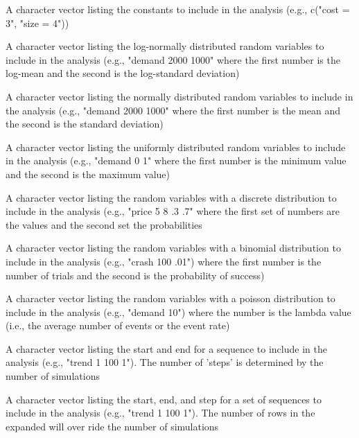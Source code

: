 \documentclass[a4paper]{book}
\begin{document}
\begin{Arguments}
\begin{ldescription}
\item[\code{const}] A character vector listing the constants to include in the analysis (e.g., c("cost = 3", "size = 4"))

\item[\code{lnorm}] A character vector listing the log-normally distributed random variables to include in the analysis (e.g., "demand 2000 1000" where the first number is the log-mean and the second is the log-standard deviation)

\item[\code{norm}] A character vector listing the normally distributed random variables to include in the analysis (e.g., "demand 2000 1000" where the first number is the mean and the second is the standard deviation)

\item[\code{unif}] A character vector listing the uniformly distributed random variables to include in the analysis (e.g., "demand 0 1" where the first number is the minimum value and the second is the maximum value)

\item[\code{discrete}] A character vector listing the random variables with a discrete distribution to include in the analysis (e.g., "price 5 8 .3 .7" where the first set of numbers are the values and the second set the probabilities

\item[\code{binom}] A character vector listing the random variables with a binomial distribution to include in the analysis (e.g., "crash 100 .01") where the first number is the number of trials and the second is the probability of success)

\item[\code{pois}] A character vector listing the random variables with a poisson distribution to include in the analysis (e.g., "demand 10") where the number is the lambda value (i.e., the average number of events or the event rate)

\item[\code{sequ}] A character vector listing the start and end for a sequence to include in the analysis (e.g., "trend 1 100 1"). The number of 'steps' is determined by the number of simulations

\item[\code{grid}] A character vector listing the start, end, and step for a set of sequences to include in the analysis (e.g., "trend 1 100 1"). The number of rows in the expanded will over ride the number of simulations


\end{ldescription}
\end{Arguments}
\end{document}
